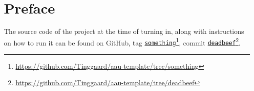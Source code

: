 \chapter*{Preface}\label{chap:preface}
The source code of the project at the time of turning in, along with instructions on how to run it can be found on GitHub, tag \href{https://github.com/Tinggaard/aau-template/tree/something}{\texttt{something}}\footnote{\url{https://github.com/Tinggaard/aau-template/tree/something}}, commit \href{https://github.com/Tinggaard/aau-template/tree/deadbeef}{\texttt{deadbeef}}\footnote{\url{https://github.com/Tinggaard/aau-template/tree/deadbeef}}.

